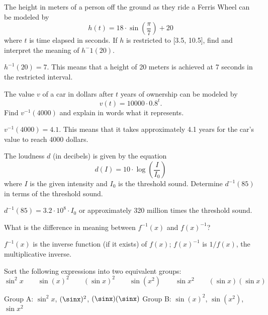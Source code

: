 \begin{exercises}
\begin{exercise}
The height in meters of a person off the ground as they ride a 
Ferris Wheel can be modeled by
\[
h(t) = 18\cdot \sin( \frac{\pi}{7} ) + 20
\]
where $t$ is time elapsed in seconds.
If $h$ is restricted to [3.5, 10.5],  find and interpret the meaning of $h^-1(20)$.
\begin{answer}
$h^{-1}(20)=7$.  This means that a height of 20 meters is achieved at 7 seconds
in the restricted interval.
\end{answer}
\end{exercise}


\begin{exercise}
The value $v$ of a car in dollars after $t$ years of ownership can be
modeled by
\[
v(t) = 10000\cdot 0.8^{t}.
\]
Find $v^{-1}(4000)$ and explain in words what it represents.
\begin{answer}
$v^{-1}(4000) = 4.1$.  This means that it takes approximately 4.1 years
for the car's value to reach 4000 dollars.
\end{answer}
\end{exercise}



\begin{exercise}
The loudness $d$ (in decibels) is given by the equation
\[
d(I) = 10\cdot \log(\frac{I}{I_0})
\]
where $I$ is the given intensity and $I_0$ is the threshold sound.
Determine $d^{-1}(85)$ in terms of the threshold sound.
\begin{answer}
$d^{-1}(85) = 3.2 \cdot 10^{8} \cdot  I_0$ or approximately 320 million times the threshold sound.
\end{answer}
\end{exercise}



\begin{exercise}
What is the difference in meaning between $f^{-1}(x)$ and $f(x)^{-1}$?
\begin{answer}
$f^{-1}(x)$ is the inverse function (if it exists) of $f(x)$;
  $f(x)^{-1}$ is $1/f(x)$, the multiplicative inverse.
\end{answer}
\end{exercise}



\begin{exercise}
Sort the following expressions into two equivalent groups:
\[
\sin^2 x \qquad \sin(x)^2 \qquad (\sin x)^2 \qquad \sin(x^2) \qquad  \sin x^2 \qquad (\sin x)(\sin x)
\]
\begin{answer}
Group A:  $\sin^2x$, $(\sinx)^2$, $(\sinx)(\sinx)$
Group B: $\sin(x)^2$, $\sin(x^2)$, $\sin x^2$
\end{answer}
\end{exercise}


\end{exercises}
